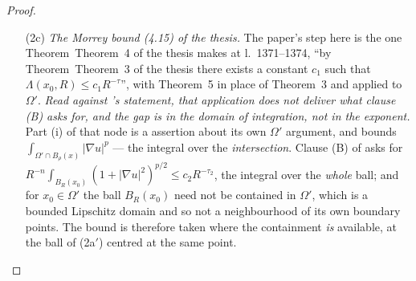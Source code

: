 \begin{proof}
\begin{enumerate}
  field $A$, the modulus $\sigma$, the point $x_0$ and the value $U(x_0)$.  Its
  hypotheses are $2\le n$, $1<p$, $0\le\varepsilon$, $0<\gamma_0$ and
  $0<\gamma_1$ --- the last from $0<\gamma_0\le\gamma_1$ --- the openness of
  $\Omega$, the membership $x_0\in\Omega$, which holds because
  $\Omega'\subseteq\overline{\Omega'}\subseteq\Omega$, and the present theorem's
  (Q1) of the thesis--(Q2) of the thesis () and
  (Q6) of the thesis () bundles, all present.  Its
  second conclusion is
  $\mathrm{EllipticStructureQ12}\;n\;p\;\varepsilon\;\gamma_0\;\gamma_1\;
  \mathrm{univ}\;\widetilde A$ (), which is
  exactly what Step 3 consumes; the normalisation is performed inside that node,
  so the passage from $A^0$ to $\widetilde A$ --- the paper's own at thesis
  l.~542 --- is not reproduced here.  \emph{The step that cannot be taken
  naively is inside it as well}: (Q1) of the thesis and (Q2) of the thesis hold only for
  \emph{almost every} $x$, while $x_0$ is a single point and hence null, so they
  say nothing at the frozen centre until they are upgraded to hold at every
  point of $\Omega$, and that upgrade is what consumes (Q6) of the thesis (pm-0034).
  An earlier version of this proof assembled all six clauses here by hand, as
   once did; the equation-side node
  now states that conclusion, so what was an assembly is a citation.  The guard
  $\gamma_1\le r\gamma_0$ holds with equality.
\item[(2c)] \emph{The Morrey bound (4.15) of the thesis.}  The paper's step here is
  the one Theorem~Theorem~4 of the thesis makes at l.~1371--1374, ``by
  Theorem~Theorem~3 of the thesis there exists a constant $c_1$ such that
  $\Lambda(x_0,R)\le c_1R^{-\tau}$'', with Theorem~5 in place of Theorem~3 and
  applied to $\Omega'$.  \emph{Read against
  's statement, that application does not
  deliver what clause \textup{(B)} asks for, and the gap is in the domain of
  integration, not in the exponent.}  Part (i) of that node is a
   assertion about its own $\Omega'$ argument, and
   bounds $\int_{\Omega'\cap B_\rho(x)}|\nabla u|^p$ ---
  the integral over the \emph{intersection}.  Clause (B) of
   asks for
  $R^{-n}\int_{B_R(x_0)}(1+|\nabla u|^2)^{p/2}\le c_2R^{-\tau_2}$, the integral
  over the \emph{whole} ball; and for $x_0\in\Omega'$ the ball $B_R(x_0)$ need
  not be contained in $\Omega'$, which is a bounded Lipschitz domain and so not
  a neighbourhood of its own boundary points.  The bound is therefore taken
  where the containment \emph{is} available, at the ball of (2a$'$) centred at
  the same point.


\end{enumerate}
\end{proof}
